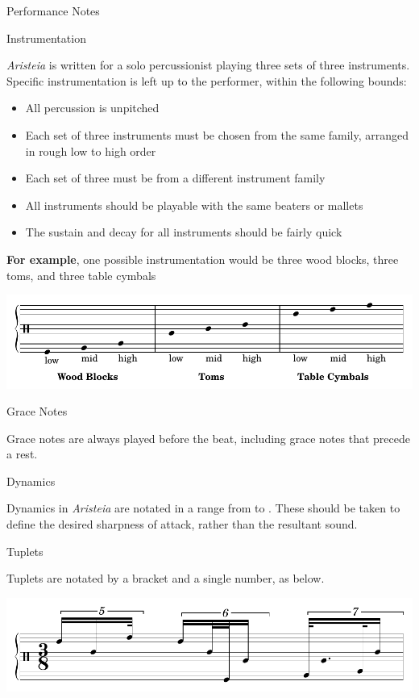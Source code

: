 \documentclass{article}
\begin{document}
\begin{center}
  {\Huge Performance Notes }
\end{center}

{\large Instrumentation}

\textit{Aristeia} is written for a solo percussionist playing three sets of three instruments.
Specific instrumentation is left up to the performer, within the following bounds:

\begin{itemize}
  \item All percussion is unpitched
  \item Each set of three instruments must be chosen from the same family, arranged in rough low to high order
  \item Each set of three must be from a different instrument family
  \item All instruments should be playable with the same beaters or mallets
  \item The sustain and decay for all instruments should be fairly quick
\end{itemize}

{\bf For example}, one possible instrumentation would be three wood blocks, three toms, and three table cymbals

\begin{center}
  \includegraphics[scale=.8]{./instruments-cropped.pdf}
\end{center}

{\large Grace Notes}

Grace notes are always played before the beat, including grace notes that precede a rest.


{\large Dynamics}

Dynamics in \textit{Aristeia} are notated in a range from  to . These should be taken to define the desired sharpness of attack, rather than the resultant sound.

\pagebreak

{\large Tuplets}

Tuplets are notated by a bracket and a single number, as below.

\begin{center}
  \includegraphics[scale=.8]{./tuplets-cropped.pdf}
\end{center}
\end{document}
